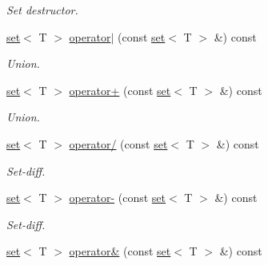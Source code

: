 \begin{DoxyCompactItemize}
\begin{DoxyCompactList}\small\item\em Set destructor. \end{DoxyCompactList}\item 
\hypertarget{classmerlin_1_1set_a13ebc00884144896d3cafb6552cd760a}{}\hyperlink{classmerlin_1_1set}{set}$<$ T $>$ \hyperlink{classmerlin_1_1set_a13ebc00884144896d3cafb6552cd760a}{operator$\vert$} (const \hyperlink{classmerlin_1_1set}{set}$<$ T $>$ \&) const \label{classmerlin_1_1set_a13ebc00884144896d3cafb6552cd760a}

\begin{DoxyCompactList}\small\item\em Union. \end{DoxyCompactList}\item 
\hypertarget{classmerlin_1_1set_affa59b7a3c25985c36cfa8d13f005f5c}{}\hyperlink{classmerlin_1_1set}{set}$<$ T $>$ \hyperlink{classmerlin_1_1set_affa59b7a3c25985c36cfa8d13f005f5c}{operator+} (const \hyperlink{classmerlin_1_1set}{set}$<$ T $>$ \&) const \label{classmerlin_1_1set_affa59b7a3c25985c36cfa8d13f005f5c}

\begin{DoxyCompactList}\small\item\em Union. \end{DoxyCompactList}\item 
\hypertarget{classmerlin_1_1set_a53f01cf729d6762f3aad050a3c80ad74}{}\hyperlink{classmerlin_1_1set}{set}$<$ T $>$ \hyperlink{classmerlin_1_1set_a53f01cf729d6762f3aad050a3c80ad74}{operator/} (const \hyperlink{classmerlin_1_1set}{set}$<$ T $>$ \&) const \label{classmerlin_1_1set_a53f01cf729d6762f3aad050a3c80ad74}

\begin{DoxyCompactList}\small\item\em Set-\/diff. \end{DoxyCompactList}\item 
\hypertarget{classmerlin_1_1set_ab5230f892f1e830152477325ad03985f}{}\hyperlink{classmerlin_1_1set}{set}$<$ T $>$ \hyperlink{classmerlin_1_1set_ab5230f892f1e830152477325ad03985f}{operator-\/} (const \hyperlink{classmerlin_1_1set}{set}$<$ T $>$ \&) const \label{classmerlin_1_1set_ab5230f892f1e830152477325ad03985f}

\begin{DoxyCompactList}\small\item\em Set-\/diff. \end{DoxyCompactList}\item 
\hypertarget{classmerlin_1_1set_ab140657855d16aafab6f16cb57409a64}{}\hyperlink{classmerlin_1_1set}{set}$<$ T $>$ \hyperlink{classmerlin_1_1set_ab140657855d16aafab6f16cb57409a64}{operator\&} (const \hyperlink{classmerlin_1_1set}{set}$<$ T $>$ \&) const \label{classmerlin_1_1set_ab140657855d16aafab6f16cb57409a64}


\end{DoxyCompactItemize}
